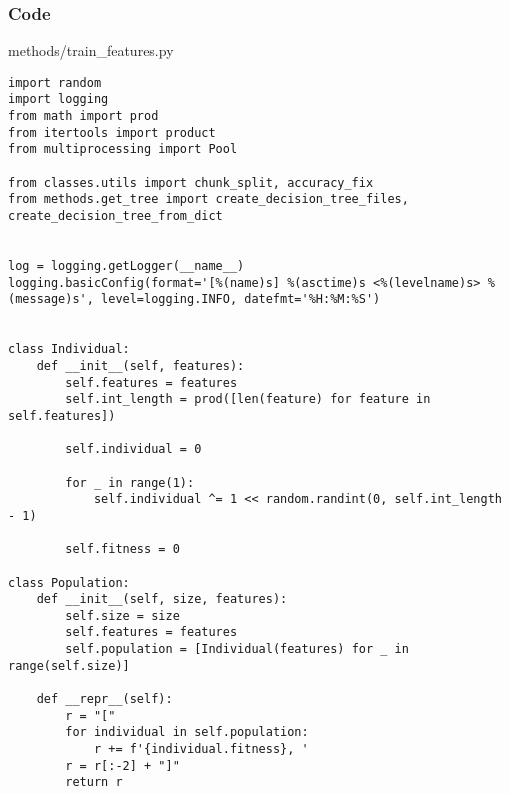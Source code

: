 \documentclass{beamer}
\begin{document}
\begin{frame}[fragile]
    \frametitle{Code}
    \scriptsize
    methods/train\_features.py \newline
    \fontsize{3pt}{5pt}\selectfont
    \begin{verbatim}
import random
import logging
from math import prod
from itertools import product
from multiprocessing import Pool

from classes.utils import chunk_split, accuracy_fix
from methods.get_tree import create_decision_tree_files, create_decision_tree_from_dict


log = logging.getLogger(__name__)
logging.basicConfig(format='[%(name)s] %(asctime)s <%(levelname)s> %(message)s', level=logging.INFO, datefmt='%H:%M:%S')


class Individual:
    def __init__(self, features):
        self.features = features
        self.int_length = prod([len(feature) for feature in self.features])

        self.individual = 0

        for _ in range(1):
            self.individual ^= 1 << random.randint(0, self.int_length - 1)

        self.fitness = 0

class Population:
    def __init__(self, size, features):
        self.size = size
        self.features = features
        self.population = [Individual(features) for _ in range(self.size)]
        
    def __repr__(self):
        r = "["
        for individual in self.population:
            r += f'{individual.fitness}, '
        r = r[:-2] + "]"
        return r
    \end{verbatim}
\end{frame}
\end{document}

